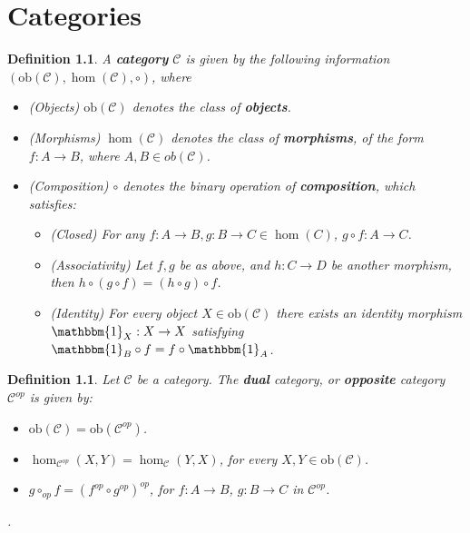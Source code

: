 \documentclass[11pt]{report}
\newcommand{\mcC}{\mathcal{C}}
\newcommand{\ob}{\text{ob}}
\newtheorem{defn}[thm]{Definition} %
\begin{document}
\chapter{Categories}
\begin{defn}
  A \textbf{category} $\mcC$ is given by the following information $(\ob(\mcC), \hom(\mcC), \circ)$, where
  \begin{itemize}
  \item (Objects) $\ob(\mcC)$ denotes the class of \textbf{objects}. \\
  \item (Morphisms) $\hom(\mcC)$ denotes the class of \textbf{morphisms}, of the form $f:A \to B$, where $A, B \in ob(\mcC)$. \\
  \item (Composition) $\circ$ denotes the binary operation of \textbf{composition}, which satisfies:
    \begin{itemize}
    \item (Closed) For any $f: A \to B, g:B \to C \in \hom(C)$, $g \circ f: A \to C$. \\
    \item (Associativity) Let $f,g$ be as above, and $h:C \to D$ be another morphism, then $h \circ (g \circ f) = (h \circ g) \circ f$. \\
    \item (Identity) For every object $X \in \ob(\mcC)$ there exists an identity morphism $\mathbbm{1}_X:X \to X$ satisfying
      $\mathbbm{1}_B \circ f = f \circ \mathbbm{1}_A$.
    \end{itemize}
  \end{itemize}
\end{defn}

\begin{defn}
  Let $\mcC$ be a category. The \textbf{dual} category, or \textbf{opposite} category $\mcC^{op}$ is given by:
  \begin{itemize}
  \item $\ob(\mcC) = \ob(\mcC^{op})$.
  \item $\hom_{\mcC^{op}}(X, Y) = \hom_{\mcC}(Y, X)$, for every $X, Y \in \ob(\mcC)$.
  \item $g \circ_{op} f = (f^{op} \circ g^{op})^{op}$, for $f: A \to B$, $g: B \to C$ in $\mcC^{op}$.
  \end{itemize}
  \begin{center}
    .
  \end{center}

\end{defn}
\end{document}

